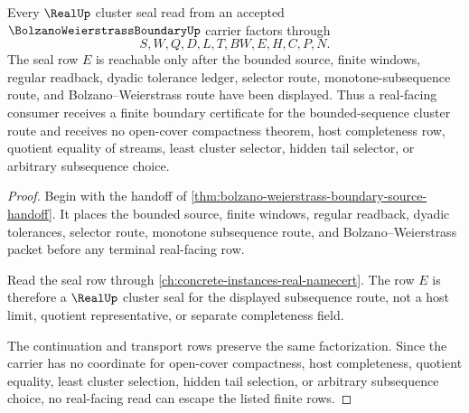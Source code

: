 \begin{theorem}
\label{thm:bolzano-weierstrass-boundary-real-seal-nonescape}
Every $\RealUp$ cluster seal read from an accepted $\BolzanoWeierstrassBoundaryUp$ carrier factors through
$$
S,W,Q,D,L,T,BW,E,H,C,P,N.
$$
The seal row $E$ is reachable only after the bounded source, finite windows, regular readback, dyadic tolerance ledger, selector route, monotone-subsequence route, and Bolzano--Weierstrass route have been displayed. Thus a real-facing consumer receives a finite boundary certificate for the bounded-sequence cluster route and receives no open-cover compactness theorem, host completeness row, quotient equality of streams, least cluster selector, hidden tail selector, or arbitrary subsequence choice.
\end{theorem}
\begin{proof}
Begin with the handoff of \autoref{thm:bolzano-weierstrass-boundary-source-handoff}. It places the bounded source, finite windows, regular readback, dyadic tolerances, selector route, monotone subsequence route, and Bolzano--Weierstrass packet before any terminal real-facing row.

Read the seal row through \autoref{ch:concrete-instances-real-namecert}. The row $E$ is therefore a $\RealUp$ cluster seal for the displayed subsequence route, not a host limit, quotient representative, or separate completeness field.

The continuation and transport rows preserve the same factorization. Since the carrier has no coordinate for open-cover compactness, host completeness, quotient equality, least cluster selection, hidden tail selection, or arbitrary subsequence choice, no real-facing read can escape the listed finite rows.
\end{proof}



